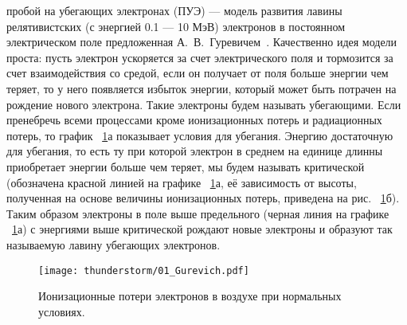 пробой на убегающих электронах (ПУЭ) --- модель развития лавины релятивистских (с энергией 0.1 --- 10 МэВ) электронов в постоянном электрическом поле предложенная А.~В.~Гуревичем~\cite{gurevich1992runaway,Gurevich2001ufn}. Качественно идея модели проста: пусть электрон ускоряется за счет электрического поля и тормозится за счет взаимодействия со средой, если он получает от поля больше энергии чем теряет, то у него появляется избыток энергии, который может быть потрачен на рождение нового электрона. Такие электроны будем называть убегающими. Если пренебречь всеми процессами кроме ионизационных потерь и радиационных потерь, то график ~\ref{fig:storm:gurevich}а показывает условия для убегания. Энергию достаточную для убегания, то есть ту при которой электрон в среднем на единице длинны приобретает энергии больше чем теряет, мы будем называть критической (обозначена красной линией на графике ~\ref{fig:storm:gurevich}а, её зависимость  от высоты, полученная на основе величины ионизационных потерь, приведена на рис. ~\ref{fig:storm:gurevich}б). Таким образом электроны в поле выше предельного (черная линия на графике ~\ref{fig:storm:gurevich}а) с энергиями выше критической рождают новые электроны и образуют так называемую лавину убегающих электронов. 
%
\begin{figure}[t]
    \begin{center}
      \texttt{[image: thunderstorm/01\_Gurevich.pdf]}
      \caption{Ионизационные потери электронов в воздухе при нормальных условиях.}
    \end{center}
    \label{fig:storm:gurevich}
\end{figure}

